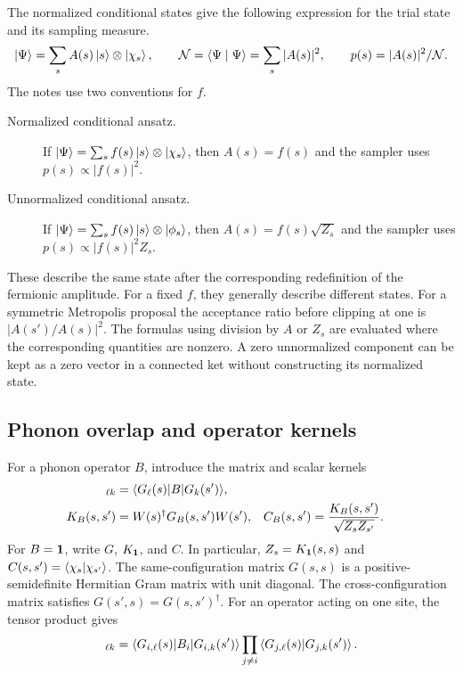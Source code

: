 \documentclass[../../main.tex]{subfiles}
\begin{document}
The normalized conditional states give the following expression for the
trial state and its sampling measure.
\begin{equation}
 \left\lvert \Psi \right\rangle=\sum_s A(s)\left\lvert s \right\rangle\otimes\left\lvert \chi_s \right\rangle,
 \qquad
 \mathcal{N}=\langle\Psi\mid\Psi\rangle=\sum_s |A(s)|^2,\qquad
 p(s)=|A(s)|^2/\mathcal{N}.
 \label{eq:state}
\end{equation}
The notes use two conventions for \(f\).
\begin{description}
 \item[Normalized conditional ansatz.] If
 \(\left\lvert \Psi \right\rangle=\sum_s f(s)\left\lvert s \right\rangle\otimes\left\lvert \chi_s \right\rangle\), then \(A(s)=f(s)\)
 and the sampler uses \(p(s)\propto |f(s)|^2\).
 \item[Unnormalized conditional ansatz.] If
 \(\left\lvert \Psi \right\rangle=\sum_s f(s)\left\lvert s \right\rangle\otimes\left\lvert \phi_s \right\rangle\), then
 \(A(s)=f(s)\sqrt{Z_s}\) and the sampler uses \(p(s)\propto |f(s)|^2Z_s\).
\end{description}
These describe the same state after the corresponding redefinition of the
fermionic amplitude. For a fixed \(f\), they generally describe different
states. For a symmetric Metropolis proposal the acceptance ratio before
clipping at one is \(|A(s')/A(s)|^2\). The formulas using division by \(A\)
or \(Z_s\) are evaluated where the corresponding quantities are nonzero.
A zero unnormalized component can be kept as a zero vector in a connected
ket without constructing its normalized state.

\subsection{Phonon overlap and operator kernels}
\label{sec:kernels}

For a phonon operator \(B\), introduce the matrix and scalar kernels
\begin{align}
 [G_B(s,s')]_{\ell k} &= \mel{G_\ell(s)}{B}{G_k(s')},\\
 K_B(s,s') &= W(s)^\dagger G_B(s,s')W(s'), &
 C_B(s,s') &= \frac{K_B(s,s')}{\sqrt{Z_s Z_{s'}}}.
 \label{eq:kernels}
\end{align}
For \(B=\mathbf{1}\), write \(G\), \(K_{\mathbf{1}}\), and \(C\). In particular,
\(Z_s=K_{\mathbf{1}}(s,s)\) and \(C(s,s')=\left\langle \chi_s \middle| \chi_{s'} \right\rangle\).
The same-configuration matrix \(G(s,s)\) is a positive-semidefinite
Hermitian Gram matrix with unit diagonal. The cross-configuration matrix
satisfies \(G(s',s)=G(s,s')^\dagger\). For an operator acting on one site,
the tensor product gives
\begin{equation}
 [G_{B_i}(s,s')]_{\ell k}
 =\mel{G_{i,\ell}(s)}{B_i}{G_{i,k}(s')}
   \prod_{j\ne i}\braket{G_{j,\ell}(s)}{G_{j,k}(s')}.
 \label{eq:site-kernel}
\end{equation}
\end{document}
